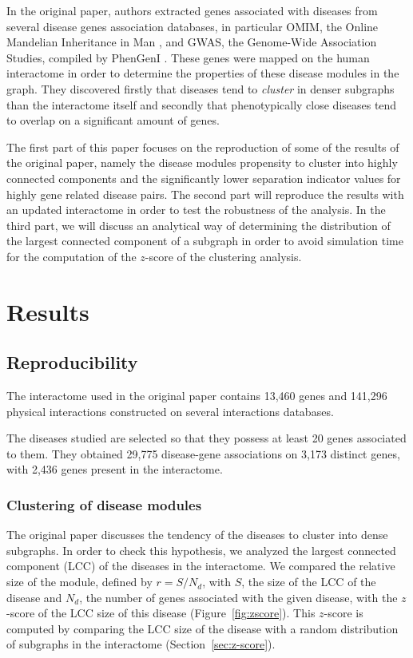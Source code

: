 \documentclass[letterpaper]{article}
\begin{document}
In the original paper, authors extracted genes associated with diseases from several disease genes
association databases, in particular OMIM, the Online Mandelian Inheritance in Man \citep{amberger2008OMIM},
and GWAS, the Genome-Wide Association Studies, compiled by PhenGenI \citep{ramos2014PhenGenI}. These
genes were mapped on the human interactome in order to determine the properties of these disease modules
in the graph. They discovered firstly that diseases tend to \textit{cluster} in denser subgraphs than
the interactome itself and secondly that phenotypically close diseases tend to overlap on a significant
amount of genes.

The first part of this paper focuses on the reproduction of some of the results of the original paper,
namely the disease modules propensity to cluster into highly connected components and the significantly
lower separation indicator values for highly gene related disease pairs. The second part will reproduce
the results with an updated interactome in order to test the robustness of the analysis. In the third
part, we will discuss an analytical way of determining the distribution of the largest connected
component of a subgraph in order to avoid simulation time for the computation of the $z$-score of the
clustering analysis.

\section{Results}
	\subsection{Reproducibility}\label{subsec:reproducibility}
	The interactome used in the original paper contains 13,460 genes and 141,296 physical interactions
	constructed on several interactions databases.

	The diseases studied are selected so that they possess at least 20 genes associated to them.
	They obtained 29,775 disease-gene associations on 3,173 distinct genes, with 2,436 genes present in
	the interactome.

		\subsubsection{Clustering of disease modules}
		The original paper discusses the tendency of the diseases to cluster into dense subgraphs. In order
		to check this hypothesis, we analyzed the largest connected component (LCC) of the diseases in the
		interactome. We compared the relative size of the module, defined by $r = S/N_d$, with $S$, the size
		of the LCC of the disease and $N_d$, the number of genes associated with the given disease, with
		the $z$-score of the LCC size of this disease (Figure~\ref{fig:zscore}). This $z$-score is computed
		by comparing the LCC size of the disease with a random distribution of subgraphs in the interactome
		(Section~\ref{sec:z-score}).
\end{document}
